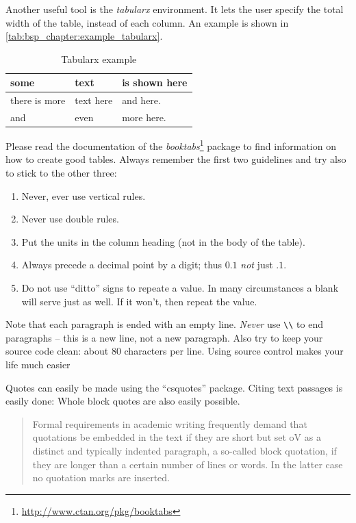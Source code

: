 Another useful tool is the \emph{tabularx} environment. 
It lets the user specify the total width of the table, instead of each column. 
An example is shown in \autoref{tab:bsp_chapter:example_tabularx}.

\begin{table}[t]
    \centering
    \begin{tabularx}{0.9\linewidth}{lXX} \toprule
        some & text & is shown here \\ \midrule
        there is more & text here & and here. \\
        and & even & more here. \\ \bottomrule
    \end{tabularx}
    \caption{Tabularx example}
    \label{tab:bsp_chapter:example_tabularx}
\end{table}

Please read the documentation of the
\emph{booktabs}\footnote{\url{http://www.ctan.org/pkg/booktabs}} 
package to find information on how to create good tables.
Always remember the first two guidelines and try also to stick to the other three:
\begin{enumerate}
    \item Never, ever use vertical rules.
    \item Never use double rules.
    \item Put the units in the column heading (not in the body of the table).
    \item Always precede a decimal point by a digit; thus $0.1$ \emph{not} just $.1$.
    \item Do not use \enquote{ditto} signs to repeate a value. In many circumstances a blank will serve just as well. If it won't, then repeat the value.
\end{enumerate}

%
Note that each paragraph is ended with an empty line. 
\emph{Never} use \verb|\\| to end paragraphs -- this is a new line, not a new paragraph.
Also try to keep your source code clean: about 80 characters per line.
Using source control makes your life much easier

%
Quotes can easily be made using the \enquote{csquotes} package.
Citing text passages is easily done:  Whole block quotes are also easily 
possible.

\blockquote{Formal requirements in academic writing frequently demand that
quotations be embedded in the text if they are short but set oV as a distinct
and typically indented paragraph, a so-called block quotation, if they are
longer than a certain number of lines or words. In the latter case no quotation
marks are inserted.}

